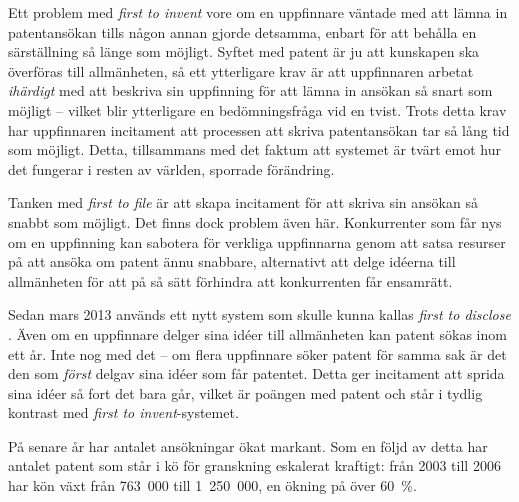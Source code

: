 Ett problem med \emph{first to invent} vore om en uppfinnare väntade med att lämna in patentansökan tills någon annan gjorde detsamma, enbart för att behålla en särställning så länge som möjligt. Syftet med patent är ju att kunskapen ska överföras till allmänheten, så ett ytterligare krav är att uppfinnaren arbetat \emph{ihärdigt} med att beskriva sin uppfinning för att lämna in ansökan så snart som möjligt -- vilket blir ytterligare en bedömningsfråga vid en tvist. Trots detta krav har uppfinnaren incitament att processen att skriva patentansökan tar så lång tid som möjligt. Detta, tillsammans med det faktum att systemet är tvärt emot hur det fungerar i resten av världen, sporrade förändring.

Tanken med \emph{first to file} är att skapa incitament för att skriva sin ansökan så snabbt som möjligt. Det finns dock problem även här. Konkurrenter som får nys om en uppfinning kan sabotera för verkliga uppfinnarna genom att satsa resurser på att ansöka om patent ännu snabbare, alternativt att delge idéerna till allmänheten för att på så sätt förhindra att konkurrenten får ensamrätt.

Sedan mars 2013 används ett nytt system som skulle kunna kallas \emph{first to disclose} \cite{kravets}. Även om en uppfinnare delger sina idéer till allmänheten kan patent sökas inom ett år. Inte nog med det -- om flera uppfinnare söker patent för samma sak är det den som \emph{först} delgav sina idéer som får patentet. Detta ger incitament att sprida sina idéer så fort det bara går, vilket är poängen med patent och står i tydlig kontrast med \emph{first to invent}-systemet.




På senare år har antalet ansökningar ökat markant. Som en följd av detta har antalet patent som står i kö för granskning eskalerat kraftigt: från 2003 till 2006 har kön växt från 763~000 till 1~250~000, en ökning på över 60~\%.
